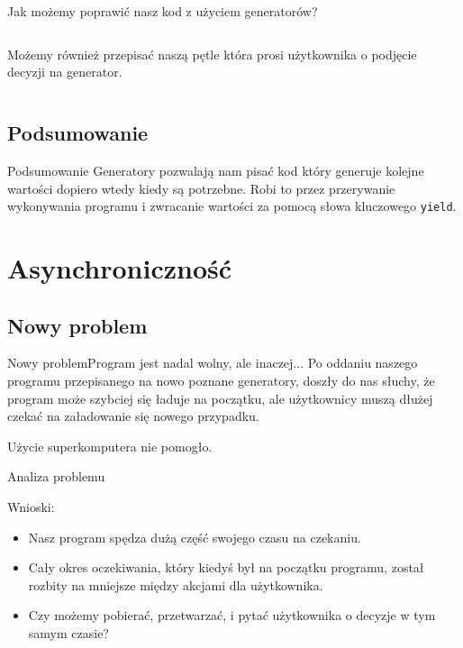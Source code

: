 \documentclass[aspectratio=169]{beamer}
\begin{document}
\begin{frame}[fragile]{Jak możemy poprawić nasz kod z użyciem generatorów?}
  \begin{columns}
    \begin{column}{0.5 \textwidth}
      Możemy również przepisać naszą pętle która prosi użytkownika o podjęcie 
      decyzji na generator.
    \end{column}
    \begin{column}{0.5 \textwidth}
      \scriptsize
      \inputminted[linenos]{python}{./examples/moreGenerator.py}
    \end{column}
  \end{columns}
\end{frame}

\subsection{Podsumowanie}
\begin{frame}{Podsumowanie}
  Generatory pozwalają nam pisać kod który generuje kolejne wartości dopiero
  wtedy kiedy są potrzebne. Robi to przez przerywanie wykonywania programu i
  zwracanie wartości za pomocą słowa kluczowego \texttt{yield}.
\end{frame}

\section{Asynchroniczność}
\subsection{Nowy problem}
\begin{frame}{Nowy problem}{Program jest nadal wolny, ale inaczej...}
  Po oddaniu naszego programu przepisanego na nowo poznane generatory,
  doszły do nas słuchy, że program może szybciej się ładuje na początku, ale 
  użytkownicy muszą dłużej czekać na załadowanie się nowego przypadku.
  \pause

  Użycie superkomputera nie pomogło.
\end{frame}

\begin{frame}{Analiza problemu}
  
  \pause 
  Wnioski: 
  \begin{itemize}
    \item Nasz program spędza dużą część swojego czasu na czekaniu.
      \pause
    \item Cały okres oczekiwania, który kiedyś był na początku programu, został
      rozbity na mniejsze między akcjami dla użytkownika.
      \pause
    \item Czy możemy pobierać, przetwarzać, i pytać użytkownika o decyzje w tym 
      samym czasie?
  \end{itemize}
\end{frame}
\end{document}
